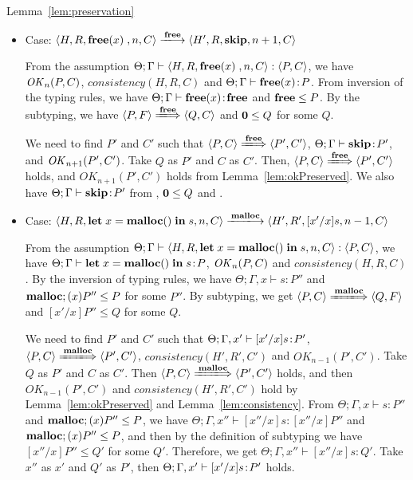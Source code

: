 \begin{pfof}{Lemma~\ref{lem:preservation}}
\begin{itemize}
\item Case: \(\langle H, R, \FREE, n, C\rangle \xlongrightarrow{\Free}
  \langle H', R, \SKIP, n + 1, C \rangle \)

  From the assumption \( \Theta; \Gamma \vdash \langle H, R, \mathbf{free}(x)\;, n,
  C \rangle : \langle P, C \rangle\), we have \(\mathit{OK}_n(P, C)\),
  \(consistency(H, R, C)\) and \(\Theta; \Gamma \vdash \mathbf{free}(x) \!:\! P\).
  From inversion of the typing rules, we have \(\Theta; \Gamma \vdash
  \mathbf{free}(x) \!:\! \mathbf{free}\) and \(\mathbf{free} \le P\). By the subtyping, we have
  \( \langle P, F \rangle \xLongrightarrow{\Free} \langle Q, C
  \rangle\) and \(\mathbf{0} \le Q \) for some \(Q\).

  We need to find \(P'\) and \(C'\) such that \( \langle P, C \rangle
  \xLongrightarrow{\Free} \langle P', C' \rangle \), \(\Theta; \Gamma
  \vdash \mathbf{skip} \!:\! P'\), and \(\mathit{OK}_{n+1}(P', C')\).  Take \(Q\) as
  \(P'\) and \(C\) as \(C'\).  Then, \( \langle P, C \rangle
  \xLongrightarrow{\Free} \langle P', C' \rangle \) holds, and
  \(OK_{n+1}(P', C')\) holds from Lemma~\ref{lem:okPreserved}.  We
  also have \(\Theta; \Gamma \vdash \mathbf{skip} \!:\! P'\) from ,
  \(\mathbf{0} \le Q\) and .

\item Case: \( \langle H, R, \LET x = \MALLOC \IN s, n, C\rangle
  \xlongrightarrow{\Malloc} \langle H', R', [x'/x]s, n - 1, C \rangle \)

  From the assumption \( \Theta; \Gamma \vdash \langle H, R, \mathbf{let}\; x =
  \mathbf{malloc()}\; \mathbf{in}\; s, n, C \rangle : \langle P, C \rangle\), we have
  \(\Theta; \Gamma \vdash \mathbf{let}\; x = \mathbf{malloc()}\; \mathbf{in}\; s \!:\! P\),
  \(\mathit{OK}_{n}(P, C)\) and \(consistency(H, R, C)\). By the inversion of
  typing rules, we have \(\Theta; \Gamma, x \vdash s : P'' \) and \(
  \mathbf{malloc}; (x)P'' \le P \) for some \(P''\). By subtyping, we get \(
  \langle P, C \rangle \xLongrightarrow{\Malloc} \langle Q, F \rangle
  \) and \( [x'/x]P'' \le Q\) for some \(Q\).

  We need to find \(P'\) and \(C'\) such that \(\Theta;\Gamma, x'
  \vdash [x'/x]s\!:\! P'\), \( \langle P, C \rangle
  \xLongrightarrow{\Malloc} \langle P', C' \rangle\),
  \(consistency(H', R', C')\) and \(OK_{n-1}(P', C')\). Take \(Q\) as
  \(P'\) and \(C\) as \(C'\).  Then \( \langle P, C \rangle
  \xLongrightarrow{\Malloc} \langle P', C' \rangle\) holds, and
  then \(OK_{n-1}(P', C')\) and \(consistency(H', R', C')\) hold by
  Lemma~\ref{lem:okPreserved} and Lemma~\ref{lem:consistency}. From
  \(\Theta; \Gamma, x \vdash s : P''\) and \( \mathbf{malloc};(x)P'' \le P\),
  we have \(\Theta; \Gamma, x'' \vdash [x''/x]s : [x''/x]P''\) and \(
  \mathbf{malloc};(x)P'' \le P\), and then by the definition of subtyping we
  have \([x''/x]P'' \le Q'\) for some \(Q'\). Therefore, we get
  \(\Theta; \Gamma, x'' \vdash [x''/x]s : Q'\). Take \(x''\) as \(x'\)
  and \(Q'\) as \(P'\), then \(\Theta;\Gamma, x' \vdash [x'/x]s\!:\!
  P'\) holds.
      

\end{itemize}
\end{pfof}
